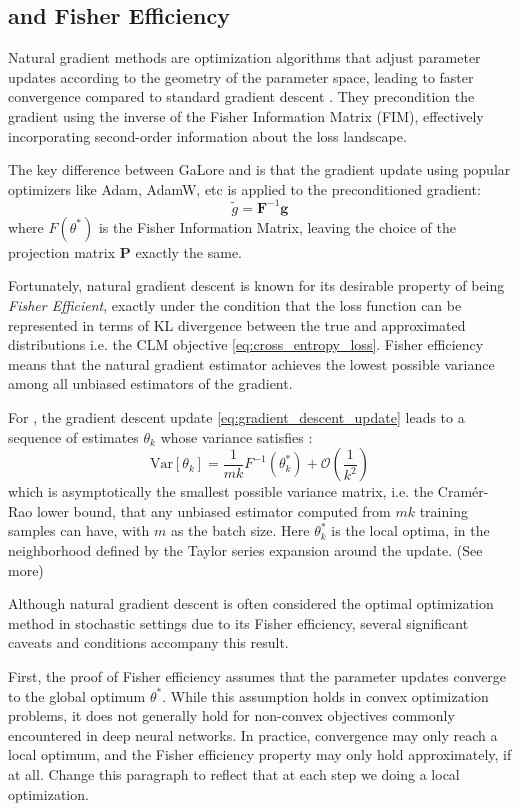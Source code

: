 \subsection{\lowrank and Fisher Efficiency}

Natural gradient methods are optimization algorithms that adjust parameter updates according to the geometry of the parameter space, leading to faster convergence compared to standard gradient descent \citep{amariNaturalGradientWorks1998}. They precondition the gradient using the inverse of the Fisher Information Matrix (FIM), effectively incorporating second-order information about the loss landscape.

The key difference between GaLore and \lowrank is that the gradient update using popular optimizers like Adam, AdamW, etc is applied to the preconditioned gradient:
\[
\tilde{g} = \mathbf{F}^{-1} \mathbf{g}
\]
where \( F(\theta^*) \) is the Fisher Information Matrix, leaving the choice of the projection matrix $\mathbf{P}$ exactly the same.

Fortunately, natural gradient descent is known \citep{martens2020new} for its desirable property of being \textit{Fisher Efficient}, exactly under the condition that the loss function can be represented in terms of KL divergence between the true and approximated distributions i.e. the CLM objective \ref{eq:cross_entropy_loss}. Fisher efficiency means that the natural gradient estimator achieves the lowest possible variance among all unbiased estimators of the gradient.

For \lowrank, the gradient descent update \ref{eq:gradient_descent_update} leads to a sequence of estimates \( \theta_k \) whose variance satisfies \citep{amariNaturalGradientWorks1998}:
\[
\text{Var}[\theta_{k}] = \frac{1}{mk} F^{-1}(\theta_{k}^*) + \mathcal{O}\left(\frac{1}{k^2}\right)
\]
which is asymptotically the smallest possible variance matrix, i.e. the Cramér-Rao lower bound, that any unbiased estimator computed from \(mk\) training samples can have, with \(m\) as the batch size. Here \(\theta_{k}^*\) is the local optima, in the neighborhood defined by the Taylor series expansion around the update. (See more)

Although natural gradient descent is often considered the optimal optimization method in stochastic settings due to its Fisher efficiency, several significant caveats and conditions accompany this result.

First, the proof of Fisher efficiency assumes that the parameter updates converge to the global optimum \( \theta^* \). While this assumption holds in convex optimization problems, it does not generally hold for non-convex objectives commonly encountered in deep neural networks. In practice, convergence may only reach a local optimum, and the Fisher efficiency property may only hold approximately, if at all. Change this paragraph to reflect that at each step we doing a local optimization.

